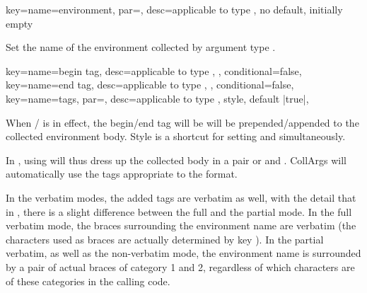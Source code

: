 \documentclass[a4paper,11pt]{article}
\begin{document}
\begin{doc}[
    pi=\docaux{cmd}{collargsEnvironment},
  ]{key={name=environment, par=,
      desc={applicable to type , no default, initially empty}}
  }

  Set the name of the environment collected by argument type
  .
\end{doc}

\begin{doc}[
    pi={\docaux{cmd}{ifcollargsBeginTag}, \docaux{cmd}{ifcollargsEndTag};
        \refcollargs{tags} has no corresponding low-level command}
    ]{
      key={name=begin tag, desc={applicable to type ,{ }}, conditional=false},
      key={name=end tag, desc={applicable to type ,{ }}, conditional=false},
      key={name=tags, par=, %
        desc={applicable to type , style, default |true|}},
    }

  When \slash {} is in effect, the
  begin\slash end tag will be will be prepended/appended to the collected
  environment body. Style  is a shortcut for setting
   and  simultaneously.

  In , using  will thus dress up the
  collected body in a pair or  and
  .  CollArgs will automatically use the tags
  appropriate to the format.

  In the verbatim modes, the added tags are verbatim as well, with the detail
  that in , there is a slight difference between the full
   and the partial  mode.  In the
  full verbatim mode, the braces surrounding the environment name are verbatim
  (the characters used as braces are actually determined by key
  ).  In the partial verbatim, as well as the
  non-verbatim mode, the environment name is surrounded by a pair of actual
  braces of category 1 and 2, regardless of which characters are of these
  categories in the calling code.
\end{doc}
\end{document}
